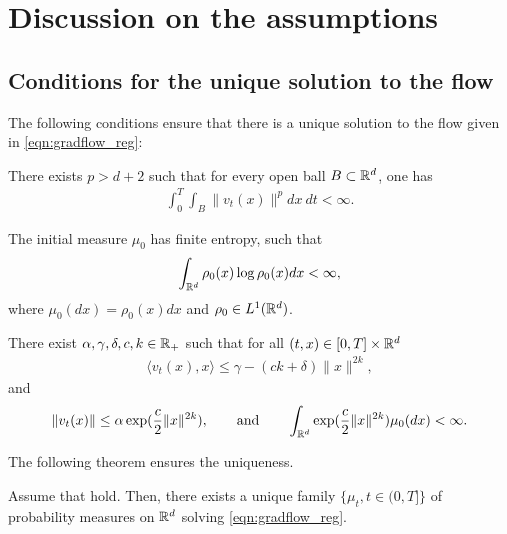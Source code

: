 \section{Discussion on the assumptions}

\subsection{Conditions for the unique solution to the flow}

The following conditions ensure that there is a unique solution to the flow given in \eqref{eqn:gradflow_reg}:
\begin{assumption}
\label{asmp:flowunq_1}
There exists $p>d+2$ such that for every open ball $B \subset \mathbb{R}^d$, one has
\begin{align}
\int_0^T \int_B \|v_t(x)\|^p dx\> dt < \infty.
\end{align}
\end{assumption}
%
\begin{assumption}
\label{asmp:flowunq_2}
The initial measure $\mu_0$ has finite entropy, such that
\begin{align}
\int_{\mathbb{R}^d} \rho_0(x) \log \rho_0(x) dx < \infty,
\end{align}
where $\mu_0(dx) = \rho_0(x)dx$ and $\rho_0 \in L^1(\mathbb{R}^d)$.
\end{assumption}
%
\begin{assumption}
\label{asmp:flowunq_3}
There exist $\alpha, \gamma, \delta, c, k \in \mathbb{R}_+$ such that for all $(t,x) \in [0,T] \times \mathbb{R}^d$ 
\begin{align}
\langle v_t(x), x \rangle \leq \gamma - (ck + \delta) \| x\|^{2k},
\end{align}
and 
\begin{align}
\label{asmp:flowunq_4}
\|v_t(x)\| \leq \alpha \exp(\frac{c}{2} \|x\|^{2k}), \qquad \text{and} \qquad \int_{\mathbb{R}^d} \exp(\frac{c}{2}\|x\|^{2k} ) \mu_0(dx) < \infty.
\end{align}
\end{assumption}

The following theorem ensures the uniqueness.
\begin{thm}
Assume that  hold. Then, there exists a unique family $\{\mu_t, t\in(0,T]\}$ of probability measures on $\mathbb{R}^d$ solving \eqref{eqn:gradflow_reg}.
\end{thm}


